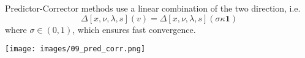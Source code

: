 \newpar{}

Predictor-Corrector methods use a linear combination of the two direction, i.e.\
\begin{equation*}
    \Delta [x,\nu,\lambda,s](v) =\Delta [x,\nu,\lambda,s](\sigma\kappa \mathbf{1})
\end{equation*}
where $\sigma\in (0,1)$, which ensures fast convergence.
\begin{center}
    \texttt{[image: images/09\_pred\_corr.png]}
\end{center}